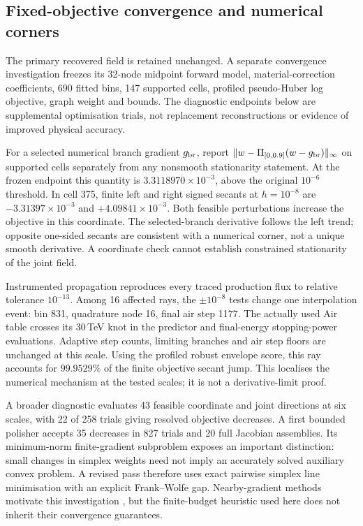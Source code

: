 \subsection{Fixed-objective convergence and numerical corners}
\label{sec:convergence-round3}
The primary recovered field is retained unchanged. A separate convergence investigation freezes its 32-node midpoint forward model, material-correction coefficients, 690 fitted bins, 147 supported cells, profiled pseudo-Huber log objective, graph weight and bounds. The diagnostic endpoints below are supplemental optimisation trials, not replacement reconstructions or evidence of improved physical accuracy.

For a selected numerical branch gradient $g_{\rm br}$, report
$\|w-\Pi_{[0,0.9]}(w-g_{\rm br})\|_\infty$ on supported cells separately from any nonsmooth stationarity statement. At the frozen endpoint this quantity is $3.3118970\times10^{-3}$, above the original $10^{-6}$ threshold. In cell 375, finite left and right signed secants at $h=10^{-8}$ are $-3.31397\times10^{-3}$ and $+4.09841\times10^{-3}$. Both feasible perturbations increase the objective in this coordinate. The selected-branch derivative follows the left trend; opposite one-sided secants are consistent with a numerical corner, not a unique smooth derivative. A coordinate check cannot establish constrained stationarity of the joint field.

Instrumented propagation reproduces every traced production flux to relative tolerance $10^{-13}$. Among 16 affected rays, the $\pm10^{-8}$ tests change one interpolation event: bin 831, quadrature node 16, final air step 1177. The actually used Air table crosses its 30\,TeV knot in the predictor and final-energy stopping-power evaluations. Adaptive step counts, limiting branches and air step floors are unchanged at this scale. Using the profiled robust envelope score, this ray accounts for $99.9529\%$ of the finite objective secant jump. This localises the numerical mechanism at the tested scales; it is not a derivative-limit proof.

A broader diagnostic evaluates 43 feasible coordinate and joint directions at six scales, with 22 of 258 trials giving resolved objective decreases. A first bounded polisher accepts 35 decreases in 827 trials and 20 full Jacobian assemblies. Its minimum-norm finite-gradient subproblem exposes an important distinction: small changes in simplex weights need not imply an accurately solved auxiliary convex problem. A revised pass therefore uses exact pairwise simplex line minimisation with an explicit Frank--Wolfe gap. Nearby-gradient methods motivate this investigation \citep{Burke2005Nonsmooth,Curtis2012Nonsmooth}, but the finite-budget heuristic used here does not inherit their convergence guarantees.


